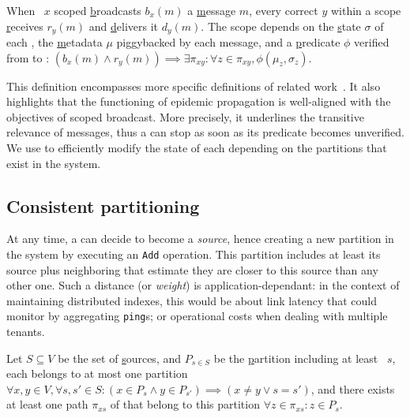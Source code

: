 \begin{definition}
  When \Process~$x$ scoped \underline{b}roadcasts $b_x(m)$ a
  \underline{m}essage $m$, every correct \process $y$ within a scope
  \underline{r}eceives $r_y(m)$ and \underline{d}elivers it
  $d_y(m)$. The scope depends on the \underline{s}tate $\sigma$ of
  each \process, the \underline{m}etadata $\mu$ piggybacked by each
  message, and a \underline{p}redicate $\phi$ verified from \process
  to \process:
  $(b_x(m) \wedge r_y(m)) \implies \exists \pi_{xy}: \forall z \in
  \pi_{xy}, \phi(\mu_z, \sigma_z)$.
\end{definition}

This definition encompasses more specific definitions of related
work~\cite{hsiao2005scoped, lue2006scoped, wang2015prodiluvian}.  It
also highlights that the functioning of epidemic propagation is
well-aligned with the objectives of scoped broadcast. More precisely,
it underlines the transitive relevance of messages, thus a \process
can stop  as soon as its predicate becomes
unverified.  We use \NAMEB to efficiently modify the state of each
\process depending on the partitions that exist in the system.



\subsection{Consistent partitioning}
\label{subsec:consistent}

At any time, a \process can decide to become a \emph{source}, hence
creating a new partition in the system by executing an \texttt{Add}
operation. This partition includes at least its source plus
neighboring \processes that estimate they are closer to this source
than any other one. Such a distance (or \emph{weight}) is
application-dependant: in the context of maintaining distributed
indexes, this would be about link latency that \nodes could monitor by
aggregating \texttt{ping}s; or operational costs when dealing with
multiple tenants.



\begin{definition}
  Let $S \subseteq V$ be the set of \underline{s}ources, and $P_{s\in
    S}$ be the \underline{p}artition including at least \Process~$s$,
  each \process belongs to at most one partition $\forall x, y \in V,
  \forall s,s' \in S: (x \in P_{s} \wedge y \in P_{s'}) \implies (x \neq
  y \vee s = s')$, and there exists at least one path $\pi_{xs}$ of
  \processes that belong to this partition $\forall z \in \pi_{xs}: z
  \in P_s$.
\end{definition}

